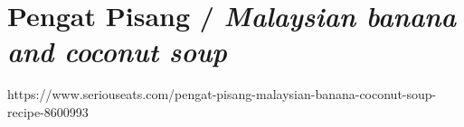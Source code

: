 \clearpage

\section{Pengat Pisang / \emph{Malaysian banana and coconut soup}}

https://www.seriouseats.com/pengat-pisang-malaysian-banana-coconut-soup-recipe-8600993
